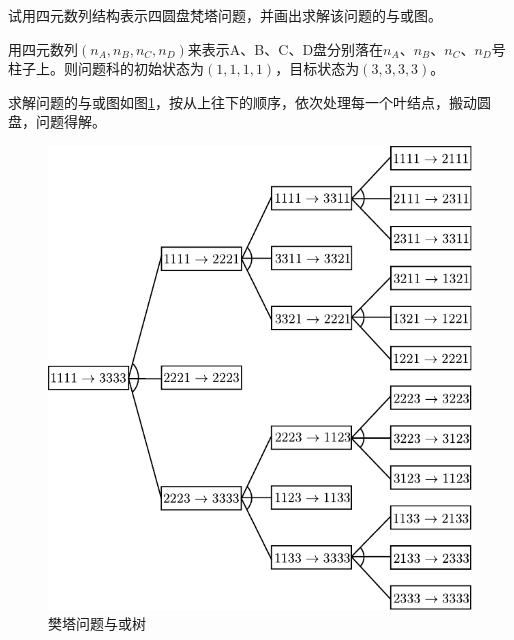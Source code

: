 \begin{question}
试用四元数列结构表示四圆盘梵塔问题，并画出求解该问题的与或图。
\end{question}
\begin{solution}
用四元数列$(n_A, n_B, n_C, n_D)$来表示A、B、C、D盘分别落在$n_A$、$n_B$、$n_C$、$n_D$号柱子上。则问题科的初始状态为$(1,1,1,1)$，目标状态为$(3,3,3,3)$。\par
求解问题的与或图如图\ref{Fig:and-or-tree-for-hannoi}，按从上往下的顺序，依次处理每一个叶结点，搬动圆盘，问题得解。 
	\begin{figure}[h]
		\centering
		\includegraphics{figures/ans-2.5.pdf}
		\caption{樊塔问题与或树} \label{Fig:and-or-tree-for-hannoi}
	\end{figure}
\end{solution}

